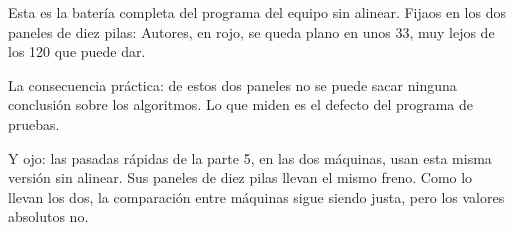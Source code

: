 Esta es la batería completa del programa del equipo sin alinear. Fijaos en los dos paneles de diez pilas: Autores, en rojo, se queda plano en unos 33, muy lejos de los 120 que puede dar.

La consecuencia práctica: de estos dos paneles no se puede sacar ninguna conclusión sobre los algoritmos. Lo que miden es el defecto del programa de pruebas.

Y ojo: las pasadas rápidas de la parte 5, en las dos máquinas, usan esta misma versión sin alinear. Sus paneles de diez pilas llevan el mismo freno. Como lo llevan los dos, la comparación entre máquinas sigue siendo justa, pero los valores absolutos no.
